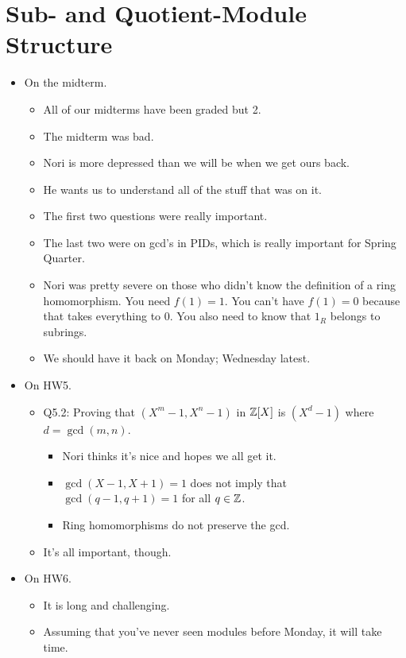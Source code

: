 \documentclass[../notes.tex]{subfiles}
\begin{document}
\section{Sub- and Quotient-Module Structure}
\begin{itemize}
    \item {}On the midterm.
    \begin{itemize}
        \item All of our midterms have been graded but 2.
        \item The midterm was bad.
        \item Nori is more depressed than we will be when we get ours back.
        \item He wants us to understand all of the stuff that was on it.
        \item The first two questions were really important.
        \item The last two were on gcd's in PIDs, which is really important for Spring Quarter.
        \item Nori was pretty severe on those who didn't know the definition of a ring homomorphism. You need $f(1)=1$. You can't have $f(1)=0$ because that takes everything to 0. You also need to know that $1_R$ belongs to subrings.
        \item We should have it back on Monday; Wednesday latest.
    \end{itemize}
    \item On HW5.
    \begin{itemize}
        \item Q5.2: Proving that $(X^m-1,X^n-1)$ in $\mathbb{Z}[X]$ is $(X^d-1)$ where $d=\gcd(m,n)$.
        \begin{itemize}
            \item Nori thinks it's nice and hopes we all get it.
            \item $\gcd(X-1,X+1)=1$ does not imply that $\gcd(q-1,q+1)=1$ for all $q\in\mathbb{Z}$.
            \item Ring homomorphisms do not preserve the gcd.
        \end{itemize}
        \item It's all important, though.
    \end{itemize}
    \item On HW6.
    \begin{itemize}
        \item It is long and challenging.
        \item Assuming that you've never seen modules before Monday, it will take time.

\end{itemize}
\end{itemize}
\end{document}
